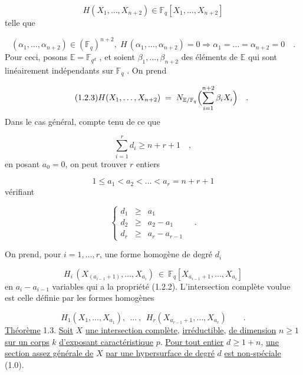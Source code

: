 \begin{equation}\tag{1.2.1}
 H(X_1,\dots,X_{n+2}) \in \mathbb{F}_q[X_1,\dots,X_{n+2}]
\end{equation}
telle que

\begin{equation}\tag{1.2.2}
(\alpha_1,\dots,\alpha_{n+2}) \in (\mathbb{F}_q)^{n+2}, \; H\,(\alpha_1,\dots,\alpha_{n+2}) = 0 \Longrightarrow \alpha_1 = \dots = \alpha_{n+2} = 0 \quad .
\end{equation}
Pour ceci, posons $\mathbb{E} = \mathbb{F}_{q^d}$ , et soient $\beta_1,\dots,\beta_{n+2}$ des éléments de $\mathbb{E}$ qui sont linéairement indépendants sur $\mathbb{F}_q$ . On prend

\begin{equation}\tag{1.2.3}
H(X_1,\dots,X_{n+2}) \;=\; N_{\mathbb{E}/\mathbb{F}_q} \Bigl( \sum_{i=1}^{n+2} \beta_i X_i \Bigr) \quad .
\end{equation}
Dans le cas général, compte tenu de ce que

\begin{equation}\tag{1.2.4}
\sum_{i=1}^r d_i \geq n+r+1 \quad ,
\end{equation}
en posant $a_0=0$, on peut trouver $r$ entiers

\begin{equation}\tag{1.2.5}
1 \leq a_1 < a_2 < \dots < a_r = n+r+1
\end{equation}
vérifiant

\begin{equation}\tag{1.2.6}
\left\{ \begin{array}{lcl} d_1 & \geq & a_1 \\[3ex] d_2 & \geq & a_2 - a_1 \\[3ex] d_r & \geq & a_r - a_{r-1} \end{array} \right. \quad .
\end{equation}


On prend, pour $i = 1,\dots,r$, une forme homogène de degré $d_i$

\begin{equation*}
H_i \, (X_{(a_{i-1}+1)},\dots,X_{a_i}) \ \in \ \mathbb{F}_q[X_{a_{i-1}+1},\dots,X_{a_i}]
\end{equation*}
en $a_i - a_{i-1}$ variables qui a la propriété (1.2.2). L'intersection complète voulue est celle définie par les formes homogènes

\begin{equation*}
H_1(X_1,\dots,X_{a_1}), \ \ \dots\ , \ \ H_r(X_{a_{r-1}+1},\dots,X_{a_r}) \qquad .
\end{equation*}
\underline{Théorème} 1.3.  \underline{Soit} $X$ \underline{une intersection complète}, \underline{irréductible}, \underline{de dimension} $n \geq 1$ \underline{sur un corps} $k$ \underline{d'exposant caractéristique} $p$. \underline{Pour tout entier} $d \geq 1 + n$, \underline{une section assez générale de} $X$ \underline{par une hypersurface de degré} $d$ \underline{est non-spéciale} (1.0).

